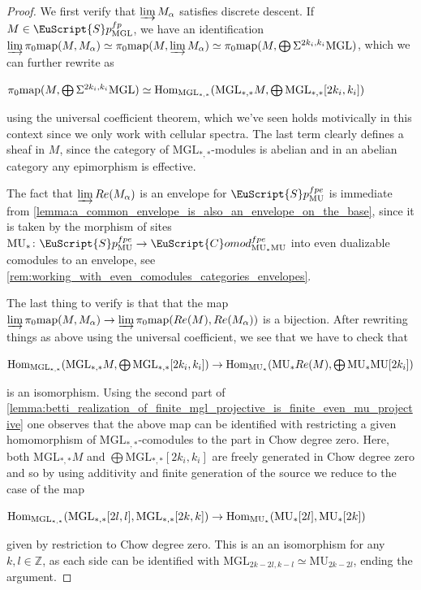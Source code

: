 \documentclass[oneside,a4paper]{amsart}
\newcommand{\euscr}[1]{\EuScript{#1}} %
\newcommand{\Hom}{\textnormal{Hom}} %
\newcommand{\map}{\textnormal{map}} %
\newcommand{\MU}{\mathrm{MU}} %
\newcommand{\MGL}{\mathrm{MGL}} %
\newcommand{\spectra}{\euscr{S}p} %
\newcommand{\spectramufpe}{\spectra_{\MU}^{fpe}} %
\newcommand{\Comod}{\euscr{C}omod} %
\newcommand{\ComodMU}{\Comod_{\MU_{*}\MU}} %
\theoremstyle{plain}
\theoremstyle{definition}
\theoremstyle{remark}
\begin{document}
\begin{proof}
We first verify that $\varinjlim M_{\alpha}$ satisfies discrete descent. If $M \in \spectra_{\MGL}^{fp}$, we have an identification $\varinjlim \pi_{0} \map(M, M_{\alpha}) \simeq \pi_{0} \map(M, \varinjlim M_{\alpha}) \simeq \pi_{0} \map(M, \bigoplus \Sigma^{2k_{i}, k_{i}} \MGL)$, which we can further rewrite as 

\begin{center}
$\pi_{0} \map(M, \bigoplus \Sigma^{2k_{i}, k_{i}} \MGL) \simeq \Hom_{\MGL_{*, *}}(\MGL_{*, *}M, \bigoplus \MGL_{*, *}[2k_{i}, k_{i}])$ 
\end{center}
using the universal coefficient theorem, which we've seen holds motivically in this context since we only work with cellular spectra. The last term clearly defines a sheaf in $M$, since the category of $\MGL_{*, *}$-modules is abelian and in an abelian category any epimorphism is effective. 

The fact that $\varinjlim Re(M_{\alpha})$ is an envelope for $\spectramufpe$ is immediate from \cref{lemma:a_common_envelope_is_also_an_envelope_on_the_base}, since it is taken by the morphism of sites $\MU_{*} \colon \spectramufpe \rightarrow \ComodMU^{fpe}$ into even dualizable comodules to an envelope, see \cref{rem:working_with_even_comodules_categories_envelopes}. 

The last thing to verify is that that the map $\varinjlim \pi_{0} \map(M, M_{\alpha}) \rightarrow \varinjlim \pi_{0} \map(Re(M), Re(M_{\alpha}))$ is a bijection. After rewriting things as above using the universal coefficient, we see that we have to check that 

\begin{center}
$\Hom_{\MGL_{*, *}}(\MGL_{*, *}M, \bigoplus \MGL_{*, *}[2k_{i}, k_{i}]) \rightarrow \Hom_{\MU_{*}}(\MU_{*}Re(M), \bigoplus \MU_{*}\MU[2k_{i}])$
\end{center}
is an isomorphism. Using the second part of \cref{lemma:betti_realization_of_finite_mgl_projective_is_finite_even_mu_projective} one observes that the above map can be identified with restricting a given homomorphism of $\MGL_{*, *}$-comodules to the part in Chow degree zero. Here, both $\MGL_{*, *}M$ and $\bigoplus \MGL_{*, *}[2k_{i}, k_{i}]$ are freely generated in Chow degree zero and so by using additivity and finite generation of the source we reduce to the case of the map

\begin{center}
$\Hom_{\MGL_{*, *}}(\MGL_{*, *}[2l, l], \MGL_{*, *}[2k, k]) \rightarrow \Hom_{\MU_{*}}(\MU_{*}[2l], \MU_{*}[2k])$ 
\end{center}
given by restriction to Chow degree zero. This is an an isomorphism for any $k, l \in \mathbb{Z}$, as each side can be identified with $\MGL_{2k-2l, k-l} \simeq \MU_{2k-2l}$, ending the argument. 
\end{proof}
\end{document}
